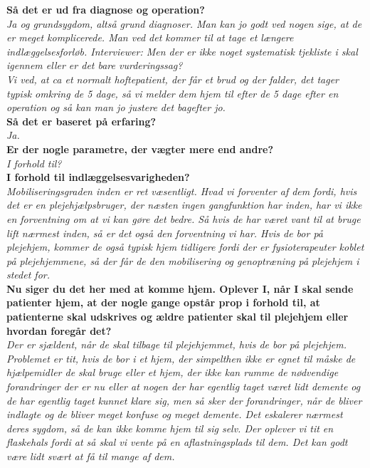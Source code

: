 \noindent
\textbf{Så det er ud fra diagnose og operation?} \\
\noindent
\textit{Ja og grundsygdom, altså grund diagnoser. Man kan jo godt ved nogen sige, at de er meget komplicerede. Man ved det kommer til at tage et længere indlæggelsesforløb.
Interviewer: Men der er ikke noget systematisk tjekliste i skal igennem eller er det bare vurderingssag?} \\
\noindent
\textit{Vi ved, at ca et normalt hoftepatient, der får et brud og der falder, det tager typisk omkring de 5 dage, så vi melder dem hjem til efter de 5 dage efter en operation og så kan man jo justere det bagefter jo.} \\
\noindent
\textbf{Så det er baseret på erfaring?} \\
\noindent
\textit{Ja.} \\
\noindent
\textbf{Er der nogle parametre, der vægter mere end andre? } \\
\noindent
\textit{I forhold til?} \\
\noindent
\textbf{I forhold til indlæggelsesvarigheden?} \\
\noindent
\textit{Mobiliseringsgraden inden er ret væsentligt. Hvad vi forventer af dem fordi, hvis det er en plejehjælpsbruger, der næsten ingen gangfunktion har inden, har vi ikke en forventning om at vi kan gøre det bedre. Så hvis de har været vant til at bruge lift nærmest inden,  så er det også den forventning vi har. Hvis de bor på plejehjem, kommer de også typisk hjem tidligere fordi der er fysioterapeuter koblet på plejehjemmene, så der får de den mobilisering og genoptræning på plejehjem i stedet for. } \\
\noindent
\textbf{Nu siger du det her med at komme hjem. Oplever I, når I skal sende patienter hjem, at der nogle gange opstår prop i forhold til, at patienterne skal udskrives og ældre patienter skal til plejehjem eller hvordan foregår det? } \\
\noindent
\textit{Der er sjældent, når de skal tilbage til plejehjemmet, hvis de bor på plejehjem. Problemet er tit, hvis de bor i et hjem, der simpelthen ikke er egnet til måske de hjælpemidler de skal bruge eller et hjem, der ikke kan rumme de nødvendige forandringer der er nu eller at nogen der har egentlig taget været lidt demente og de har egentlig taget kunnet klare sig, men så sker der forandringer, når de bliver indlagte og de bliver meget konfuse og meget demente. Det eskalerer nærmest deres sygdom, så de kan ikke komme hjem til sig selv. Der oplever vi tit en flaskehals fordi at så skal vi vente på en aflastningsplads til dem. Det kan godt være lidt svært at få til mange af dem.} \\
